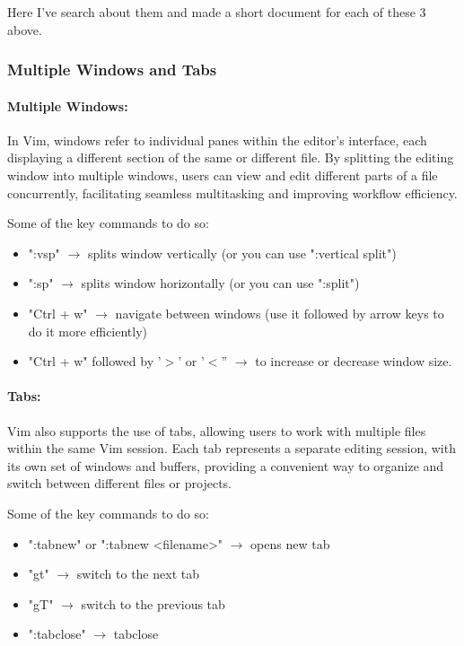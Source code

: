 \documentclass{article}
\begin{document}
	Here I've search about them and made a short document for each of these 3 above.

	\subsubsection{Multiple Windows and Tabs}
	\paragraph{Multiple Windows:} In Vim, windows refer to individual panes within the editor's interface, each displaying a different section of the same or different file.
	By splitting the editing window into multiple windows, users can view and edit different parts of a file concurrently, facilitating seamless multitasking and improving workflow efficiency.

	Some of the key commands to do so:
	\begin{itemize}
		\item ":vsp" $\rightarrow$ splits window vertically (or you can use ":vertical split")
		\item ":sp" $\rightarrow$ splits window horizontally (or you can use ":split")
		\item "Ctrl + w" $\rightarrow$ navigate between windows (use it followed by arrow keys to do it more efficiently)
		\item "Ctrl + w" followed by '$>$' or '$<$'' $\rightarrow$ to increase or decrease window size.
	\end{itemize}

	\paragraph{Tabs:} Vim also supports the use of tabs, allowing users to work with multiple files within the same Vim session.
	Each tab represents a separate editing session, with its own set of windows and buffers, providing a convenient way to organize and
	switch between different files or projects.

	Some of the key commands to do so:
	\begin{itemize}
		\item ":tabnew" or ":tabnew <filename>" $\rightarrow$ opens new tab
		\item "gt" $\rightarrow$ switch to the next tab
		\item "gT" $\rightarrow$ switch to the previous tab
		\item ":tabclose" $\rightarrow$ tabclose
	\end{itemize}
\end{document}
